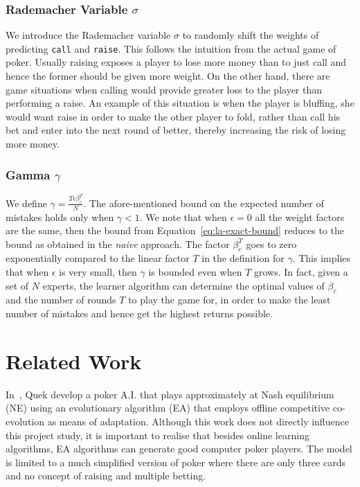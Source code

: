 \documentclass[12pt]{article}
\begin{document}
\subsubsection*{Rademacher Variable $\sigma$}
We introduce the Rademacher variable $\sigma$ to randomly shift the weights of predicting \texttt{call} and \texttt{raise}.
This follows the intuition from the actual game of poker. Usually raising exposes a player to lose more money than to just call
and hence the former should be given more weight. On the other hand, there are game situations when calling would provide greater
loss to the player than performing a raise. An example of this situation is when the player is bluffing, she would want raise in
order to make the other player to fold, rather than call his bet and enter into the next round of better, thereby increasing the risk
of losing more money.

\subsubsection*{Gamma $\gamma$}
We define $\gamma=\frac{T\epsilon\beta_c^T}{N}$. The afore-mentioned bound on the expected number of mistakes holds only when
$\gamma < 1$. We note that when $\epsilon = 0$ \ie all the weight factors are the same, then the bound from Equation~\ref{eq:la-exact-bound}
reduces to the bound as obtained in the {\em naive} approach. The factor $\beta_c^T$ goes to zero exponentially compared to the linear
factor $T$ in the definition for $\gamma$. This implies that when $\epsilon$ is very small, then $\gamma$ is bounded even when $T$ grows.
In fact, given a set of $N$ experts, the learner algorithm can determine the optimal values of $\beta_c$ and the number of rounds $T$ to play
the game for, in order to make the least number of mistakes and hence get the highest returns possible.

\section{Related Work}
\label{sec:related}
\noindent In~\cite{quek2009evolving}, Quek \etal develop a poker A.I. that plays approximately at Nash equilibrium (NE) using an
evolutionary algorithm (EA) that employs offline competitive co-evolution as means of adaptation. Although this work does not directly
influence this project study, it is important to realise that besides online learning algorithms, EA algorithms can generate
good computer poker players. The model is limited to a much simplified version of poker where there are only three cards
and no concept of raising and multiple betting.\\
\end{document}
